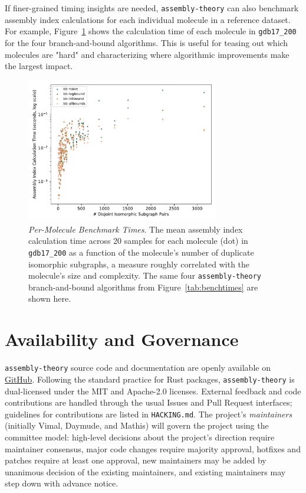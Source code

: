 \documentclass[acmsmall,nonacm,screen]{acmart}  %
\newif\iffigabbrv
\newcommand{\figtext}{\iffigabbrv Fig.\else Figure\fi}
\begin{document}
If finer-grained timing insights are needed, \texttt{assembly-theory} can also benchmark assembly index calculations for each individual molecule in a reference dataset.
For example, \figtext~\ref{fig:timescatter} shows the calculation time of each molecule in \texttt{gdb17\_200} for the four branch-and-bound algorithms.
This is useful for teasing out which molecules are "hard" and characterizing where algorithmic improvements make the largest impact.

\begin{figure}[tbh]
    \centering
    \includegraphics[width=0.75\textwidth]{jossplot.pdf}
    \caption{\textit{Per-Molecule Benchmark Times}.
    The mean assembly index calculation time across 20 samples for each molecule (dot) in \texttt{gdb17\_200} as a function of the molecule's number of duplicate isomorphic subgraphs, a measure roughly correlated with the molecule's size and complexity.
    The same four \texttt{assembly-theory} branch-and-bound algorithms from \figtext~\ref{tab:benchtimes} are shown here.}
    \label{fig:timescatter}
\end{figure}




\section{Availability and Governance} \label{sec:governance}

\texttt{assembly-theory} source code and documentation are openly available on \href{https://github.com/DaymudeLab/assembly-theory}{GitHub}.
Following the standard practice for Rust packages, \texttt{assembly-theory} is dual-licensed under the MIT and Apache-2.0 licenses.
External feedback and code contributions are handled through the usual Issues and Pull Request interfaces; guidelines for contributions are listed in \texttt{HACKING.md}.
The project's \textit{maintainers} (initially Vimal, Daymude, and Mathis) will govern the project using the committee model: high-level decisions about the project's direction require maintainer consensus, major code changes require majority approval, hotfixes and patches require at least one approval, new maintainers may be added by unanimous decision of the existing maintainers, and existing maintainers may step down with advance notice.
\end{document}
